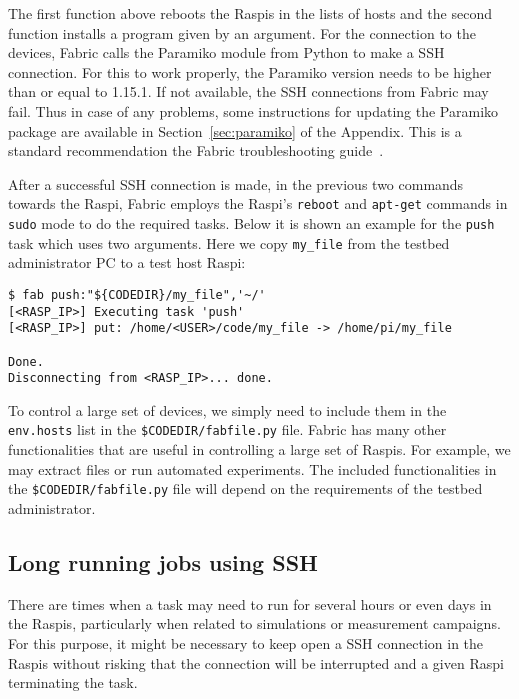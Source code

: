 The first function above reboots the \ac{Raspi}s in the lists of hosts and
the second function installs a program given by an argument. For the
connection to the devices, Fabric calls the Paramiko module from Python
to make a \ac{SSH} connection. For this to work properly, the Paramiko
version needs to be higher than or equal to 1.15.1. If not available,
the \ac{SSH} connections from Fabric may fail. Thus in case of any problems,
some instructions for updating the Paramiko package are available in
Section~\ref{sec:paramiko} of the Appendix. This is a standard recommendation
the Fabric troubleshooting guide~\cite{2016fabricsupport}.

After a successful \ac{SSH}
connection is made, in the previous two commands towards the \ac{Raspi},
Fabric employs the \ac{Raspi}'s \texttt{reboot} and \texttt{apt-get}
commands in \texttt{sudo} mode to do the required tasks. Below it is shown
an example for the \texttt{push} task which uses two arguments. Here we
copy \texttt{my\_file} from the testbed administrator \ac{PC} to a test
host \ac{Raspi}:

\begin{lstlisting}[]
$ fab push:"${CODEDIR}/my_file",'~/'
[<RASP_IP>] Executing task 'push'
[<RASP_IP>] put: /home/<USER>/code/my_file -> /home/pi/my_file

Done.
Disconnecting from <RASP_IP>... done.
\end{lstlisting}
\FloatBarrier
\vspace{-5mm}

To control a large set of devices, we simply need to include them in the
\texttt{env.hosts} list in the \texttt{\$CODEDIR/fabfile.py} file. Fabric has
many other functionalities that are useful in controlling a large set of
\ac{Raspi}s. For example, we may extract files or run automated
experiments. The included functionalities in the
\texttt{\$CODEDIR/fabfile.py} file will depend on the requirements of the
testbed administrator.

\subsection{Long running jobs using SSH}
There are times when a task may need to run for several hours or even days
in the \ac{Raspi}s, particularly when related to simulations or measurement
campaigns. For this purpose, it might be necessary to keep open a \ac{SSH}
connection in the \ac{Raspi}s without risking that the connection will
be interrupted and a given \ac{Raspi} terminating the task.

